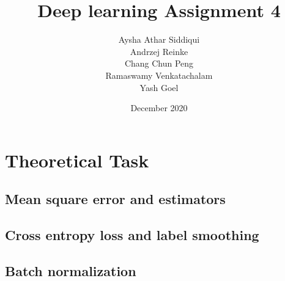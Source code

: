 \documentclass{article}
\title{Deep learning Assignment 4}
\author{Aysha Athar Siddiqui\\
Andrzej Reinke\\
Chang Chun Peng\\
Ramaswamy Venkatachalam\\
Yash Goel
}
\date{December 2020}
\begin{document}
\maketitle
\section{Theoretical Task }

\subsection{Mean square error and estimators}

\subsection{Cross entropy loss and label smoothing}

\subsection{Batch normalization}
\end{document}

